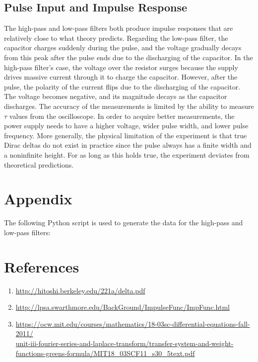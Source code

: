 \documentclass{article}
\begin{document}
	\subsection{Pulse Input and Impulse Response}
	The high-pass and low-pass filters both produce impulse responses that are relatively close to what theory predicts. Regarding the low-pass filter, the capacitor charges suddenly during the pulse, and the voltage gradually decays from this peak after the pulse ends due to the discharging of the capacitor. In the high-pass filter's case, the voltage over the resistor surges because the supply drives massive current through it to charge the capacitor. However, after the pulse, the polarity of the current flips due to the discharging of the capacitor. The voltage becomes negative, and its magnitude decays as the capacitor discharges. The accuracy of the measurements is limited by the ability to measure $\tau$ values from the oscilloscope. In order to acquire better measurements, the power supply needs to have a higher voltage, wider pulse width, and lower pulse frequency. More generally, the physical limitation of the experiment is that true Dirac deltas do not exist in practice since the pulse always has a finite width and a noninfinite height. For as long as this holds true, the experiment deviates from theoretical predictions.
	
	\section{Appendix}
	The following Python script is used to generate the data for the high-pass and low-pass filters:
	
	\section{References}
	\begin{enumerate}
		\item \label{itm:dirac_delta_def} \url{http://hitoshi.berkeley.edu/221a/delta.pdf}
		\item \label{itm:sifting_prop} \url{http://lpsa.swarthmore.edu/BackGround/ImpulseFunc/ImpFunc.html}
		\item \label{itm:convolution_thm} \url{https://ocw.mit.edu/courses/mathematics/18-03sc-differential-equations-fall-2011/} \\
		\url{unit-iii-fourier-series-and-laplace-transform/transfer-system-and-weight-functions-greens-formula/MIT18_03SCF11_s30_5text.pdf}
	\end{enumerate}
\end{document}
